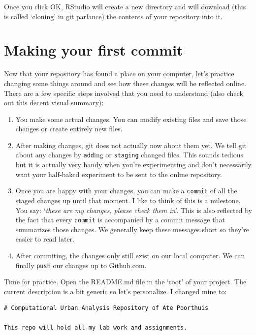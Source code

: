 \documentclass[]{book}
\providecommand{\tightlist}{%
  \setlength{\itemsep}{0pt}\setlength{\parskip}{0pt}}
\begin{document}
Once you click OK, RStudio will create a new directory and will download (this is called `cloning' in git parlance) the contents of your repository into it.

\hypertarget{making-your-first-commit}{%
\section{Making your first commit}\label{making-your-first-commit}}

Now that your repository has found a place on your computer, let's practice changing some things around and see how these changes will be reflected online. There are a few specific steps involved that you need to understand (also check out \href{http://rogerdudler.github.io/git-guide/}{this decent visual summary}):

\begin{enumerate}
\def\labelenumi{\arabic{enumi}.}
\tightlist
\item
  You make some actual changes. You can modify existing files and save those changes or create entirely new files.
\item
  After making changes, git does not actually now about them yet. We tell git about any changes by \texttt{add}ing or \texttt{staging} changed files. This sounds tedious but it is actually very handy when you're experimenting and don't necessarily want your half-baked experiment to be sent to the online repository.
\item
  Once you are happy with your changes, you can make a \texttt{commit} of all the staged changes up until that moment. I like to think of this is a milestone. You say: `\emph{these are my changes, please check them in}'. This is also reflected by the fact that every \texttt{commit} is accompanied by a commit message that summarizes those changes. We generally keep these messages short so they're easier to read later.
\item
  After commiting, the changes only still exist on our local computer. We can finally \texttt{push} our changes up to Github.com.
\end{enumerate}

Time for practice. Open the README.md file in the `root' of your project. The current description is a bit generic so let's personalize. I changed mine to:

\begin{verbatim}
# Computational Urban Analysis Repository of Ate Poorthuis

This repo will hold all my lab work and assignments.
\end{verbatim}
\end{document}
